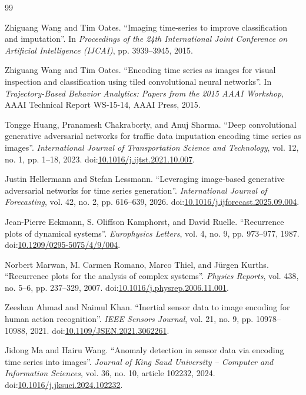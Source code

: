 \documentclass[preprint,review,12pt]{elsarticle}
\begin{document}
{\small
\begin{thebibliography}{99}
\setlength{\itemsep}{0pt}
\setlength{\parskip}{0pt}
\raggedright

Zhiguang Wang and Tim Oates. ``Imaging time-series to improve classification and imputation''. In \textit{Proceedings of the 24th International Joint Conference on Artificial Intelligence (IJCAI)}, pp. 3939--3945, 2015.

Zhiguang Wang and Tim Oates. ``Encoding time series as images for visual inspection and classification using tiled convolutional neural networks''. In \textit{Trajectory-Based Behavior Analytics: Papers from the 2015 AAAI Workshop}, AAAI Technical Report WS-15-14, AAAI Press, 2015.

Tongge Huang, Pranamesh Chakraborty, and Anuj Sharma. ``Deep convolutional generative adversarial networks for traffic data imputation encoding time series as images''. \textit{International Journal of Transportation Science and Technology}, vol. 12, no. 1, pp. 1--18, 2023. doi:\url{10.1016/j.ijtst.2021.10.007}.

Justin Hellermann and Stefan Lessmann. ``Leveraging image-based generative adversarial networks for time series generation''. \textit{International Journal of Forecasting}, vol. 42, no. 2, pp. 616--639, 2026. doi:\url{10.1016/j.ijforecast.2025.09.004}.

Jean-Pierre Eckmann, S. Oliffson Kamphorst, and David Ruelle. ``Recurrence plots of dynamical systems''. \textit{Europhysics Letters}, vol. 4, no. 9, pp. 973--977, 1987. doi:\url{10.1209/0295-5075/4/9/004}.

Norbert Marwan, M. Carmen Romano, Marco Thiel, and Jürgen Kurths. ``Recurrence plots for the analysis of complex systems''. \textit{Physics Reports}, vol. 438, no. 5--6, pp. 237--329, 2007. doi:\url{10.1016/j.physrep.2006.11.001}.

Zeeshan Ahmad and Naimul Khan. ``Inertial sensor data to image encoding for human action recognition''. \textit{IEEE Sensors Journal}, vol. 21, no. 9, pp. 10978--10988, 2021. doi:\url{10.1109/JSEN.2021.3062261}.

Jidong Ma and Hairu Wang. ``Anomaly detection in sensor data via encoding time series into images''. \textit{Journal of King Saud University -- Computer and Information Sciences}, vol. 36, no. 10, article 102232, 2024. doi:\url{10.1016/j.jksuci.2024.102232}.


\end{thebibliography}}
\end{document}
